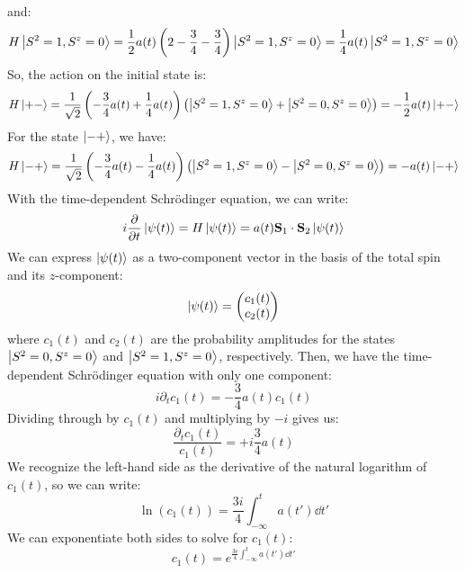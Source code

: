 \documentclass[12pt]{article}
\begin{document}
and:
\begin{equation}
  H\ket{S^2 = 1, S^z = 0} = \frac{1}{2}a(t)\left(2 - \frac{3}{4} - \frac{3}{4}\right)\ket{S^2 = 1, S^z = 0} = \frac{1}{4}a(t)\ket{S^2 = 1, S^z = 0}
\end{equation}
So, the action on the initial state is:
\begin{equation}
  H\ket{+-} = \frac{1}{\sqrt{2}}\left(-\frac{3}{4}a(t) + \frac{1}{4}a(t)\right)\left(\ket{S^2 = 1, S^z = 0} + \ket{S^2 = 0, S^z = 0}\right) = -\frac{1}{2}a(t)\ket{+-}
\end{equation}
For the state $\ket{-+}$, we have:
\begin{equation}
  H\ket{-+} = \frac{1}{\sqrt{2}}\left(-\frac{3}{4}a(t) - \frac{1}{4}a(t)\right)\left(\ket{S^2 = 1, S^z = 0} - \ket{S^2 = 0, S^z = 0}\right) = -a(t)\ket{-+}
\end{equation}
With the time-dependent Schrödinger equation, we can write:
\begin{equation}
  i \pdv{t} \ket{\psi (t)} = H\ket{\psi (t)} = a(t) \mathbf{S}_1 \cdot \mathbf{S}_2 \ket{\psi (t)}
\end{equation}
We can express $\ket{\psi (t)}$ as a two-component vector in the basis of the total spin and its $z$-component:
\begin{equation}
  \ket{\psi (t)} = \begin{pmatrix} c_1(t) \\ c_2(t) \end{pmatrix}
\end{equation}
where $c_1(t)$ and $c_2(t)$ are the probability amplitudes for the states $\ket{S^2 = 0, S^z = 0}$ and $\ket{S^2 = 1, S^z = 0}$, respectively. Then, we have the time-dependent Schrödinger equation with only one component:
\begin{equation}
  i \partial_{t} c_1(t) = -\frac{3}{4}a(t)c_1(t)
\end{equation}
Dividing through by $c_1(t)$ and multiplying by $-i$ gives us:
\begin{equation}
  \frac{\partial_{t} c_1(t)}{c_1(t)} = +i\frac{3}{4} a(t)
\end{equation}
We recognize the left-hand side as the derivative of the natural logarithm of $c_1(t)$, so we can write:
\begin{equation}
  \ln(c_1(t)) = \frac{3i}{4}\int_{-\infty}^{t} a(t')\dd{t'}
\end{equation}
We can exponentiate both sides to solve for $c_1(t)$:
\begin{equation}
  c_1(t) = e^{\frac{3i}{4}\int_{-\infty}^{t} a(t')\dd{t'}}
\end{equation}
\end{document}
